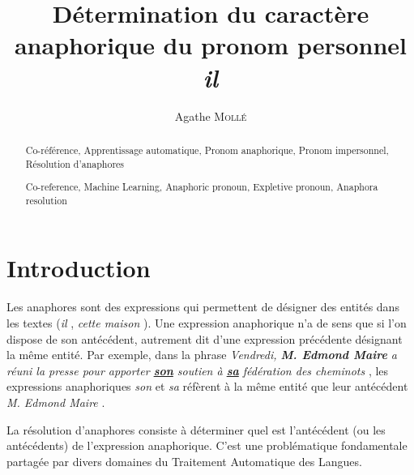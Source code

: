 \documentclass[a4paper,12pt]{article}
\title{Détermination du caractère anaphorique du pronom personnel \og{}\textit{il}\fg{}}
\author{Agathe \textsc{Mollé}}
\date{}
\begin{document}
\maketitle

\begin{abstract}

\end{abstract}


\renewcommand\abstractname{Abstract}
\begin{abstract}

\end{abstract}


\paragraph{}

\renewcommand\abstractname{Mots-clés}
\begin{abstract}
Co-référence, Apprentissage automatique, Pronom anaphorique, Pronom impersonnel, Résolution d'anaphores
\end{abstract}

\renewcommand\abstractname{Keywords}
\begin{abstract}
Co-reference, Machine Learning, Anaphoric pronoun, Expletive pronoun, Anaphora resolution
\end{abstract}

\color{gray}

\section*{Introduction}

Les anaphores sont des expressions qui permettent de désigner des entités dans les textes (\og \textit{il} \fg{}, \og \textit{cette maison} \fg{}). Une expression anaphorique n'a de sens que si l'on dispose de son antécédent, autrement dit d'une expression précédente désignant la même entité. Par exemple, dans la phrase \og \textit{Vendredi, \textbf{M. Edmond Maire} a réuni la presse pour apporter \underline{\textbf{son}} soutien à \underline{\textbf{sa}} fédération des cheminots} \fg{}, les expressions anaphoriques \og \textit{son} \fg{} et \og \textit{sa} \fg{} réfèrent à la même entité que leur antécédent \og \textit{M. Edmond Maire} \fg{}.

La résolution d'anaphores consiste à déterminer quel est l'antécédent (ou les antécédents) de l'expression anaphorique. C'est une problématique fondamentale partagée par divers domaines du Traitement Automatique des Langues.
\end{document}
